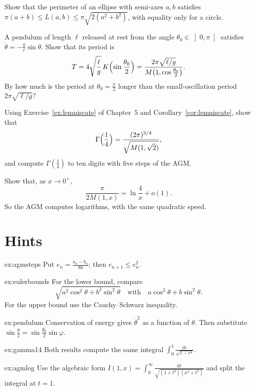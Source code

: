 \begin{exercise}[$\star$]\label{ex:eulerbounds}
Show that the perimeter of an ellipse with semi-axes $a,b$ satisfies $\pi(a+b)\le L(a,b)\le\pi\sqrt{2(a^2+b^2)}$, with equality only for a circle.
\end{exercise}

\begin{exercise}[$\star\star$]\label{ex:pendulum}
A pendulum of length $\ell$ released at rest from the angle $\theta_0\in\left]0,\pi\right[$ satisfies $\ddot\theta=-\frac g\ell\sin\theta$. Show that its period is
\[
T=4\sqrt{\frac\ell g}\,K\Bigl(\sin\frac{\theta_0}2\Bigr)=\frac{2\pi\sqrt{\ell/g}}{M\bigl(1,\cos\frac{\theta_0}2\bigr)}.
\]
By how much is the period at $\theta_0=\frac\pi2$ longer than the small-oscillation period $2\pi\sqrt{\ell/g}$?
\end{exercise}

\begin{exercise}[$\star\star$]\label{ex:gamma14}
Using Exercise~\ref{ex:lemniscate} of Chapter~5 and Corollary~\ref{cor:lemniscate}, show that
\[
\Gamma\Bigl(\frac14\Bigr)=\frac{(2\pi)^{3/4}}{\sqrt{M(1,\sqrt2)}},
\]
and compute $\Gamma(\frac14)$ to ten digits with five steps of the AGM.
\end{exercise}

\begin{exercise}[$\star\star\star$]\label{ex:agmlog}
Show that, as $x\to0^+$,
\[
\frac\pi{2M(1,x)}=\ln\frac4x+o(1).
\]
So the AGM computes logarithms, with the same quadratic speed.
\end{exercise}

\section{Hints}

\begin{hint}{ex:agmsteps}
Put $e_n=\frac{a_n-b_n}{8b}$; then $e_{n+1}\le e_n^2$.
\end{hint}
\begin{hint}{ex:eulerbounds}
For the lower bound, compare
\[
\sqrt{a^2\cos^2\theta+b^2\sin^2\theta}
\quad\text{with}\quad a\cos^2\theta+b\sin^2\theta.
\]
For the upper bound use the Cauchy--Schwarz inequality.
\end{hint}
\begin{hint}{ex:pendulum}
Conservation of energy gives $\dot\theta^2$ as a function of $\theta$. Then substitute $\sin\frac\theta2=\sin\frac{\theta_0}2\sin\varphi$.
\end{hint}
\begin{hint}{ex:gamma14}
Both results compute the same integral $\int_0^1\frac{\mathrm dr}{\sqrt{1-r^4}}$.
\end{hint}
\begin{hint}{ex:agmlog}
Use the algebraic form $I(1,x)=\int_0^\infty\frac{\mathrm dt}{\sqrt{(1+t^2)(x^2+t^2)}}$ and split the integral at $t=1$.
\end{hint}

